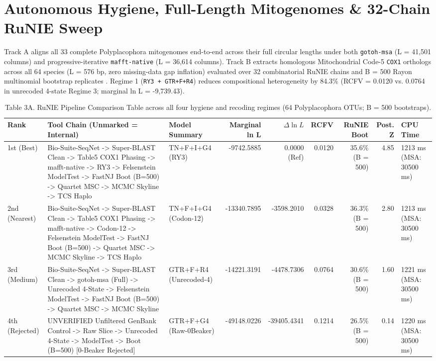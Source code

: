 \documentclass[11pt]{article}
\begin{document}
\section{Autonomous Hygiene, Full-Length Mitogenomes \& 32-Chain RuNIE Sweep}
Track A aligns all 33 complete Polyplacophora mitogenomes end-to-end across their full circular lengths under both \texttt{gotoh-msa} (L = 41,501 columns) and progressive-iterative \texttt{mafft-native} (L = 36,614 columns). Track B extracts homologous Mitochondrial Code-5 \texttt{COX1} orthologs across all 64 species (L = 576 bp, zero missing-data gap inflation) evaluated over 32 combinatorial RuNIE chains and B = 500 Rayon multinomial bootstrap replicates \cite{ref1,ref5}. Regime 1 (\texttt{RY3 + GTR+F+R4}) reduces compositional heterogeneity by 84.3\% (RCFV = 0.0120 vs. 0.0764 in unrecoded 4-state Regime 3; marginal ln L = -9,739.43).

\begin{table}[htbp]
\centering
\caption{Table 3A. RuNIE Pipeline Comparison Table across all four hygiene and recoding regimes (64 Polyplacophora OTUs; B = 500 bootstraps).}
\scriptsize
\begin{tabular}{@{}lp{1.9in}lrrrrrl@{}}
\toprule
Rank & Tool Chain (Unmarked = Internal) & Model Summary & Marginal ln L & $\Delta\ln L$ & RCFV & RuNIE Boot & Post. Z & CPU Time \\
\midrule
1st (Best) & Bio-Suite-SeqNet -> Super-BLAST Clean -> Table5 COX1 Phasing -> mafft-native -> RY3 -> Felsenstein ModelTest -> FastNJ Boot (B=500) -> Quartet MSC -> MCMC Skyline -> TCS Haplo & TN+F+I+G4 (RY3) & -9742.5885 & 0.0000 (Ref) & 0.0120 & 35.6\% (B = 500) & 4.85 & 1213 ms (MSA: 30500 ms) \\
2nd (Nearest) & Bio-Suite-SeqNet -> Super-BLAST Clean -> Table5 COX1 Phasing -> mafft-native -> Codon-12 -> Felsenstein ModelTest -> FastNJ Boot (B=500) -> Quartet MSC -> MCMC Skyline -> TCS Haplo & TN+F+I+G4 (Codon-12) & -13340.7895 & -3598.2010 & 0.0328 & 36.3\% (B = 500) & 2.80 & 1213 ms (MSA: 30500 ms) \\
3rd (Medium) & Bio-Suite-SeqNet -> Super-BLAST Clean -> gotoh-msa (Full) -> Unrecoded 4-State -> Felsenstein ModelTest -> FastNJ Boot (B=500) -> Quartet MSC -> MCMC Skyline & GTR+F+R4 (Unrecoded-4) & -14221.3191 & -4478.7306 & 0.0764 & 30.6\% (B = 500) & 1.60 & 1221 ms (MSA: 30500 ms) \\
4th (Rejected) & UNVERIFIED Unfiltered GenBank Control -> Raw Slice -> Unrecoded 4-State -> ModelTest -> Boot (B=500) [0-Beaker Rejected] & GTR+F+G4 (Raw-0Beaker) & -49148.0226 & -39405.4341 & 0.1214 & 26.5\% (B = 500) & 0.14 & 1220 ms (MSA: 30500 ms) \\
\bottomrule
\end{tabular}
\end{table}
\end{document}
